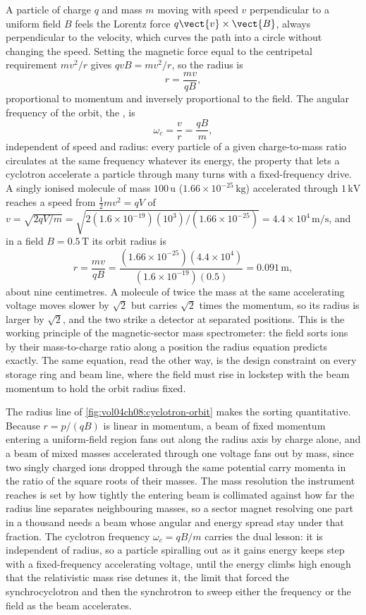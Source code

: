 A particle of charge $q$ and mass $m$ moving with speed $v$ perpendicular
to a uniform field $B$ feels the Lorentz force $q\vect{v}\times\vect{B}$,
always perpendicular to the velocity, which curves the path into a circle
without changing the speed. Setting the magnetic force equal to the
centripetal requirement $mv^{2}/r$ gives $qvB = mv^{2}/r$, so the radius
is
\[
r = \frac{mv}{qB},
\]
proportional to momentum and inversely proportional to the field. The
angular frequency of the orbit, the , is
\[
\omega_c = \frac{v}{r} = \frac{qB}{m},
\]
independent of speed and radius: every particle of a given
charge-to-mass ratio circulates at the same frequency whatever its
energy, the property that lets a cyclotron accelerate a particle through
many turns with a fixed-frequency drive. A singly ionised molecule of
mass $100\,\text{u}$ ($1.66\times 10^{-25}\,\si{\kilogram}$) accelerated
through $1\,\si{\kilo\volt}$ reaches a speed from $\tfrac12 mv^{2} = qV$
of $v = \sqrt{2qV/m} = \sqrt{2(1.6\times 10^{-19})(10^{3})/(1.66\times
10^{-25})} = 4.4\times 10^{4}\,\si{\meter\per\second}$, and in a field
$B = 0.5\,\si{\tesla}$ its orbit radius is
\[
r = \frac{mv}{qB} = \frac{(1.66\times 10^{-25})(4.4\times 10^{4})}{
(1.6\times 10^{-19})(0.5)} = 0.091\,\si{\meter},
\]
about nine centimetres. A molecule of twice the mass at the same
accelerating voltage moves slower by $\sqrt{2}$ but carries $\sqrt{2}$
times the momentum, so its radius is larger by $\sqrt{2}$, and the two
strike a detector at separated positions. This is the working principle
of the magnetic-sector mass spectrometer: the field sorts ions by their
mass-to-charge ratio along a position the radius equation predicts
exactly. The same equation, read the other way, is the design constraint
on every storage ring and beam line, where the field must rise in lockstep
with the beam momentum to hold the orbit radius fixed.

The radius line of \cref{fig:vol04ch08:cyclotron-orbit} makes the sorting
quantitative. Because $r = p/(qB)$ is linear in momentum, a beam of fixed
momentum entering a uniform-field region fans out along the radius axis by
charge alone, and a beam of mixed masses accelerated through one voltage
fans out by mass, since two singly charged ions dropped through the same
potential carry momenta in the ratio of the square roots of their masses.
The mass resolution the instrument reaches is set by how tightly the entering
beam is collimated against how far the radius line separates neighbouring
masses, so a sector magnet resolving one part in a thousand needs a beam
whose angular and energy spread stay under that fraction. The cyclotron
frequency $\omega_c = qB/m$ carries the dual lesson: it is independent of
radius, so a particle spiralling out as it gains energy keeps step with a
fixed-frequency accelerating voltage, until the energy climbs high enough
that the relativistic mass rise detunes it, the limit that forced the
synchrocyclotron and then the synchrotron to sweep either the frequency or
the field as the beam accelerates.

